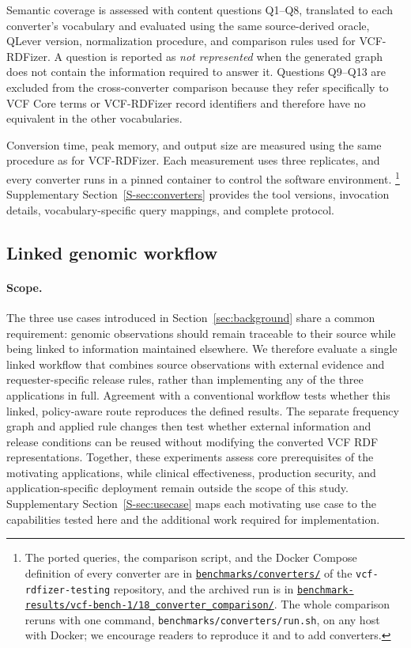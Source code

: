 \documentclass[pdflatex,sn-mathphys-num]{sn-jnl}
\begin{document}
Semantic coverage is assessed with content questions Q1--Q8, translated to each converter's vocabulary and evaluated using the same source-derived oracle, QLever version, normalization procedure, and comparison rules used for VCF-RDFizer.
A question is reported as \emph{not represented} when the generated graph does not contain the information required to answer it.
Questions Q9--Q13 are excluded from the cross-converter comparison because they refer specifically to VCF Core terms or VCF-RDFizer record identifiers and therefore have no equivalent in the other vocabularies.

Conversion time, peak memory, and output size are measured using the same procedure as for VCF-RDFizer.
Each measurement uses three replicates, and every converter runs in a pinned container to control the software environment.%
\footnote{The ported queries, the comparison script, and the Docker Compose definition of every converter are in \href{https://github.com/ecrum19/vcf-rdfizer-testing/tree/main/benchmarks/converters}{\texttt{benchmarks/converters/}} of the \texttt{vcf-rdfizer-testing} repository, and the archived run is in \href{https://github.com/ecrum19/vcf-rdfizer-testing/tree/main/BioMedSem_2026/benchmark-results/vcf-bench-1/18_converter_comparison}{\texttt{benchmark-results/vcf-bench-1/18\_converter\_comparison/}}. 
The whole comparison reruns with one command, \texttt{benchmarks/converters/run.sh}, on any host with Docker; we encourage readers to reproduce it and to add converters.}
Supplementary Section~\ref{S-sec:converters} provides the tool versions, invocation details, vocabulary-specific query mappings, and complete protocol.

\subsection{Linked genomic workflow}\label{subsec:eval-workflow}
\paragraph{Scope.}
The three use cases introduced in Section~\ref{sec:background} share a common requirement: genomic observations should remain traceable to their source while being linked to information maintained elsewhere.
We therefore evaluate a single linked workflow that combines source observations with external evidence and requester-specific release rules, rather than implementing any of the three applications in full.
Agreement with a conventional workflow tests whether this linked, policy-aware route reproduces the defined results.
The separate frequency graph and applied rule changes then test whether external information and release conditions can be reused without modifying the converted VCF RDF representations.
Together, these experiments assess core prerequisites of the motivating applications, while clinical effectiveness, production security, and application-specific deployment remain outside the scope of this study.
Supplementary Section~\ref{S-sec:usecase} maps each motivating use case to the capabilities tested here and the additional work required for implementation.
\end{document}
